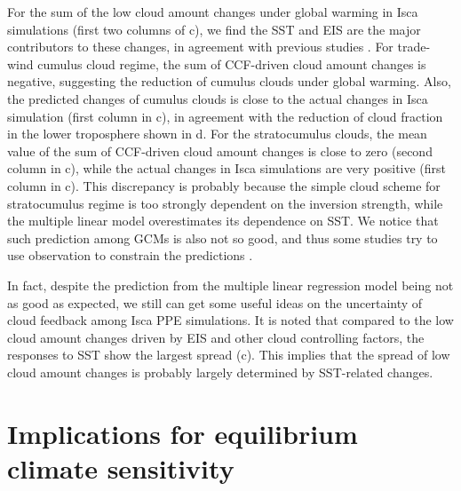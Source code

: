 For the sum of the low cloud amount changes under global warming in Isca simulations (first two columns of c), we find the SST and EIS are the major contributors to these changes, in agreement with previous studies \citep{Myers2015relationships,Myers2016,Qu2015positive,Seethala2015,Zhou2015,McCoy2016relationships}. For trade-wind cumulus cloud regime, the sum of CCF-driven cloud amount changes is negative, suggesting the reduction of cumulus clouds under global warming. Also, the predicted changes of cumulus clouds is close to the actual changes in Isca simulation (first column in c), in agreement with the reduction of cloud fraction in the lower troposphere shown in d. For the stratocumulus clouds, the mean value of the sum of CCF-driven cloud amount changes is close to zero (second column in c), while the actual changes in Isca simulations are very positive (first column in c). This discrepancy is probably because the simple cloud scheme for stratocumulus regime is too strongly dependent on the inversion strength, while the multiple linear model overestimates its dependence on SST. We notice that such prediction among GCMs is also not so good, and thus some studies try to use observation to constrain the predictions \citep{Myers2016,Myers2021}.

In fact, despite the prediction from the multiple linear regression model being not as good as expected, we still can get some useful ideas on the uncertainty of cloud feedback among Isca PPE simulations. It is noted that compared to the low cloud amount changes driven by EIS and other cloud controlling factors, the responses to SST show the largest spread (c). This implies that the spread of low cloud amount changes is probably largely determined by SST-related changes. %

\section{Implications for equilibrium climate sensitivity}
\label{sec:implification_for_ECS}


